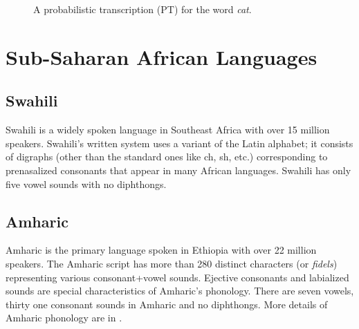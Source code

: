 \documentclass[a4paper]{article}
\newcommand{\mytikzscale}{0.9}
\newcommand{\myvspacefig}{\vspace{-4mm}}
\begin{document}
\begin{figure}
\begin{subfigure}
  \myvspacefig
  \caption{A probabilistic transcription (PT) for the word \emph{cat}.}
  \label{fig:pt}
  \end{subfigure}%
  \vspace{-1mm}
\end{figure}


\section{Sub-Saharan African Languages}  \vspace{-1mm}
\label{sec:Sub-Saharan African Languages}
\subsection{Swahili}  \vspace{-1mm}
Swahili is a widely spoken language in Southeast Africa with over 15 million speakers. Swahili's written system uses a variant of the Latin alphabet; it consists of digraphs (other than the standard ones like ch, sh, etc.) corresponding to prenasalized consonants that appear in many African languages. Swahili has only five vowel sounds with no diphthongs. 

\subsection{Amharic}  \vspace{-1mm}
Amharic is the primary language spoken in Ethiopia with over 22 million speakers. The Amharic script has more than 280 distinct characters (or {\em fidels}) representing various consonant+vowel sounds. Ejective consonants and labialized sounds are special characteristics of Amharic's phonology. There are seven vowels, thirty one consonant sounds in Amharic and no diphthongs. More details of Amharic phonology are in \cite{Tachbelie2014}.
\end{document}
